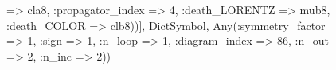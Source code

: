 \documentclass{revtex4}
\begin{document}
\begin{figure}[!htb]
\begin{center}
{=> cla8, :propagator_index => 4, :death_LORENTZ => mub8, :death_COLOR => clb8))], Dict{Symbol, Any}(:symmetry_factor => 1, :sign => 1, :n_loop => 1, :diagram_index => 86, :n_out => 2, :n_inc => 2)) 
}
\end{center}
\end{figure}
\end{document}

